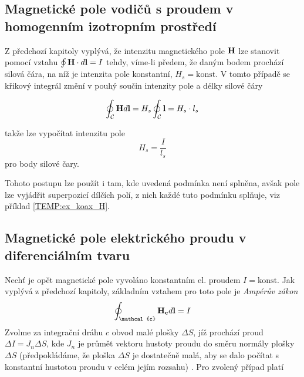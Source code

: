 {    %
    \subsection{Magnetické pole vodičů s proudem v homogen\-ním izo\-trop\-ním prostředí}
      Z předchozí kapitoly vyplývá, že intenzitu magnetického pole $\mathbf{H}$ lze stanovit pomocí
      vztahu $\oint\mathbf{H}\cdot d\mathbf{l} = I$ tehdy, víme-li předem, že daným bodem prochází silová
      čára, na níž je intenzita pole konstantní, $H_s = \text{konst}$. V tomto případě se křikový
      integrál změní v pouhý součin intenzity pole a délky silové čáry
       
       \begin{equation}\label{TEMP:eq_1MR_v_hom_p}
         \oint_\mathcal{C}\mathbf{H}d\mathbf{l} = H_s\oint_\mathcal{C}\mathbf{l} = H_s\cdot l_s
       \end{equation}      
       
      takže lze vypočítat intenzitu pole $$H_s = \frac{I}{l_s}$$ pro body silové čary. 
      
      Tohoto postupu lze použít i tam, kde uvedená podmínka není splněna, avšak pole lze vyjádřit
      superpozicí dílčích polí, z nich každé tuto podmínku splňuje, viz příklad 
      \ref{TEMP:ex_koax_H}. 

        

        

    \subsection{Magnetické pole elektrického proudu v diferenciálním tvaru}
      Nechť je opět magnetické pole vyvoláno konstantním el. proudem $I = \text{konst}$. Jak
      vyplývá z předchozí kapitoly, základním vztahem pro toto pole je \emph{Ampérův zákon}
      $$\oint_\mathcal{c}\vr{H_c}d\vr{l} = I$$  Zvolme za integrační dráhu $c$ obvod malé plošky
      $\Delta S$, jíž prochází proud $\Delta I = J_n \Delta S$, kde $J_n$ je průmět vektoru hustoty
      proudu do směru normály plošky $\Delta S$ (předpokládáme, že ploška $\Delta S$ je dostatečně
      malá, aby se dalo počítat s konstantní hustotou proudu v celém jejím rozsahu)
      \cite[s.~13]{Trnka1972}. Pro zvolený případ platí
      
}
